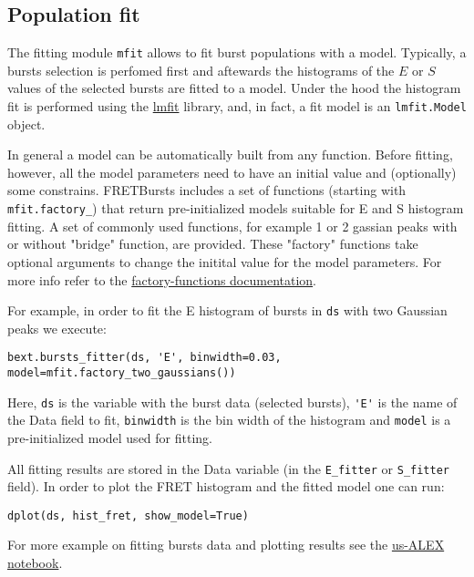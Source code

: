 
\subsection{Population fit}

The fitting module \verb|mfit| allows to fit burst populations with a model. Typically, a bursts selection is perfomed first and aftewards the histograms of the $E$ or $S$ values of the selected bursts are fitted to a model. Under the hood the histogram fit is performed using the \href{http://lmfit.github.io/lmfit-py/}{lmfit} library, and, in fact, 
a fit model is an \verb|lmfit.Model| object.

In general a model can be automatically built from any function. Before fitting, however, all the model parameters need to have an initial value and (optionally) some constrains. FRETBursts includes a set of functions (starting with \verb|mfit.factory_|) that return pre-initialized models suitable for E and S histogram fitting. A set of commonly used functions, for example 1 or 2 gassian peaks with or without "bridge" function, are provided. These "factory" functions take optional arguments to change the initital value for the model parameters. For more info refer to the
\href{http://fretbursts.readthedocs.org/en/latest/mfit.html#model-factory-functions}{factory-functions documentation}.

For example, in order to fit the E histogram of bursts in \verb|ds| with two Gaussian peaks we execute:

\begin{verbatim}
bext.bursts_fitter(ds, 'E', binwidth=0.03, model=mfit.factory_two_gaussians())
\end{verbatim}

Here, \verb|ds| is the variable with the burst data (selected bursts), \verb|'E'| is the name of the Data field to fit, \verb|binwidth| is the bin width of the histogram and \verb|model| is a pre-initialized model used for fitting.

All fitting results are stored in the Data variable (in the \verb|E_fitter| or \verb|S_fitter| field).
In order to plot the FRET histogram and the fitted model one can run:

\begin{verbatim}
dplot(ds, hist_fret, show_model=True)
\end{verbatim}

For more example on fitting bursts data and plotting results see the \href{http://nbviewer.ipython.org/urls/raw.github.com/tritemio/FRETBursts_notebooks/master/notebooks/FRETBursts\%2520-\%2520us-ALEX\%2520smFRET\%2520burst\%2520analysis.ipynb}{us-ALEX notebook}.

